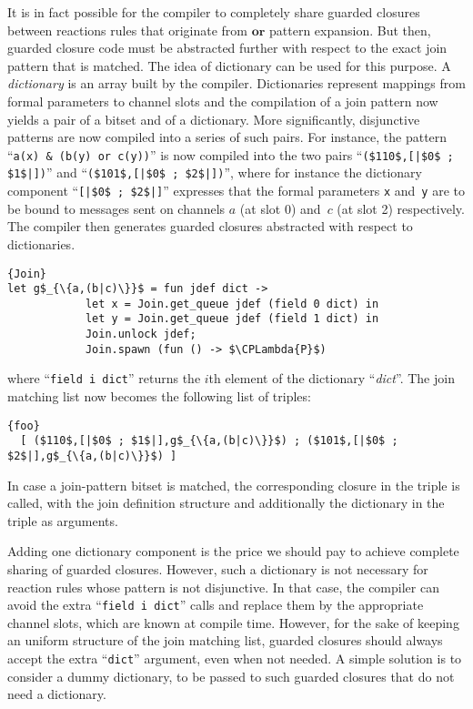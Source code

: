 \documentclass{LMCS}
\let \lst \lstinline
\newcommand{\kwd}[1]{\ensuremath{\mathbf{#1}}}
\newcommand{\id}[1]{\textit{#1}}
\renewcommand{\_}{\mathord{\rule[-.25ex]{1ex}{.15ex}}}
\newcommand{\CPLambda}[1]{\llbracket#1\rrbracket_{\lambda}}
\begin{document}
It is in fact possible for the compiler to completely share guarded
closures between reactions rules that originate from \kwd{or} pattern
expansion.  But then, guarded closure code must be abstracted further
with respect to the exact join pattern that is matched.  The idea of
dictionary can be used for this purpose. A \emph{dictionary} is
an array built by the compiler.  Dictionaries represent mappings from
formal parameters to channel slots and the compilation of a join
pattern now yields a pair of a bitset and of a dictionary.  More
significantly, disjunctive patterns are now compiled into a series of
such pairs.  For instance, the pattern ``\lst|a(x) & (b(y) or c(y))|''
is now compiled into the two pairs ``\lst!($110$,[|$0$ ; $1$|])!''
and ``\lst!($101$,[|$0$ ; $2$|])!'', where for instance the dictionary
component ``\lst![|$0$ ; $2$|]!'' expresses that the formal parameters
\lst|x| and~\lst|y| are to be bound to messages sent on channels
$\id{a}$ (at slot 0) and~$\id{c}$ (at slot 2) respectively.  The
compiler then generates guarded closures abstracted with respect to
dictionaries.
\begin{lstlisting}{Join}
let g$_{\{a,(b|c)\}}$ = fun jdef dict -> 
            let x = Join.get_queue jdef (field 0 dict) in
            let y = Join.get_queue jdef (field 1 dict) in
            Join.unlock jdef;
            Join.spawn (fun () -> $\CPLambda{P}$)
\end{lstlisting}
where ``\lst|field i dict|'' returns the $i$th element of the
dictionary ``\id{dict}''. The join matching list now becomes the
following list of triples:
\begin{lstlisting}{foo}
  [ ($110$,[|$0$ ; $1$|],g$_{\{a,(b|c)\}}$) ; ($101$,[|$0$ ; $2$|],g$_{\{a,(b|c)\}}$) ]
\end{lstlisting}
In case a join-pattern bitset is matched, the corresponding closure in
the triple is called, with the join definition structure and
additionally the dictionary in the triple as arguments.

Adding one dictionary component is the price we should pay to achieve
complete sharing of guarded closures. However, such a dictionary is
not necessary for reaction rules whose pattern is not disjunctive.  In
that case, the compiler can avoid the extra ``\lst|field i dict|''
calls and replace them by the appropriate channel slots, which are
known at compile time.  However, for the sake of keeping an uniform
structure of the join matching list, guarded closures should always
accept the extra ``\lst|dict|'' argument, even when not needed.  A
simple solution is to consider a dummy dictionary, to be passed to
such guarded closures that do not need a dictionary.
\end{document}
